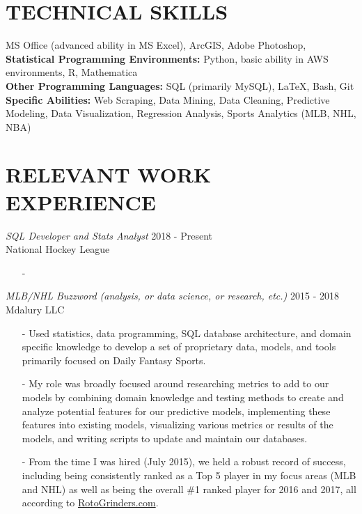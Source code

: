 \documentclass[margin]{res}
\begin{document}
\begin{resume}
\section{TECHNICAL SKILLS} 
\textbullet\hspace{3pt} MS Office (advanced ability in MS Excel), ArcGIS, Adobe Photoshop,%
\\\textbullet\hspace{3pt} \textbf{Statistical Programming Environments:} Python, basic ability in AWS environments, R, Mathematica
\\\textbullet\hspace{3pt} \textbf{Other Programming Languages:} SQL (primarily MySQL), \LaTeX, Bash, Git %
\\\textbullet \hspace{3pt} \textbf{Specific Abilities:} Web Scraping, Data Mining, Data Cleaning, Predictive Modeling, Data Visualization, Regression Analysis, Sports Analytics (MLB, NHL, NBA)

\section{RELEVANT WORK EXPERIENCE}
\textit{SQL Developer and Stats Analyst} \hfill 2018 - Present
\\National Hockey League
\begin{itemize}
\item[-]
\end{itemize}

\textit{MLB/NHL Buzzword (analysis, or data science, or research, etc.)} \hfill 2015 - 2018
\\Mdalury LLC
\begin{itemize}
\item[-] Used statistics, data programming, SQL database architecture, and domain specific knowledge to develop a set of proprietary data, models, and tools primarily focused on Daily Fantasy Sports.
\item[-] My role was broadly focused around researching metrics to add to our models by combining domain knowledge and testing methods to create and analyze potential features for our predictive models, implementing these features into existing models, visualizing various metrics or results of the models, and writing scripts to update and maintain our databases.
\item[-] From the time I was hired (July 2015), we held a robust record of success, including being consistently ranked as a Top 5 player in my focus areas (MLB and NHL) as well as being the overall \#1 ranked player for 2016 and 2017, all according to \href{https://rotogrinders.com/profiles/saahilsud}{RotoGrinders.com}.
\end{itemize}


\end{resume}
\end{document}
